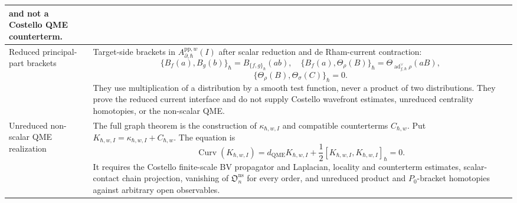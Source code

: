 \begin{longtable}{@{}>{\raggedright\arraybackslash}p{}
  >{\raggedright\arraybackslash}p{}@{}}
and not a Costello QME counterterm.\\
\hline
Reduced principal-part brackets &
Target-side brackets in
\(A_{\partial,\hbar}^{\mathrm{pp},w}(I)\) after scalar reduction and
de Rham-current contraction:
\[
  \{B_f(a),B_g(b)\}_\hbar=B_{\{f,g\}_\hbar}(ab),\quad
  \{B_f(a),\Theta_\rho(B)\}_\hbar
    =\Theta_{\operatorname{ad}^{\vee}_{f,\hbar}\rho}(aB),
\]
\[
  \{\Theta_\rho(B),\Theta_\sigma(C)\}_\hbar=0 .
\]
They use multiplication of a distribution by a smooth test function,
never a product of two distributions.  They prove the reduced current
interface and do not supply Costello wavefront estimates, unreduced
centrality homotopies, or the non-scalar QME.\\
\hline
Unreduced non-scalar QME realization &
The full graph theorem is the construction of
\(\kappa_{\hbar,w,I}\) and compatible counterterms
\(C_{\hbar,w}\).  Put
\(K_{\hbar,w,I}=\kappa_{\hbar,w,I}+C_{\hbar,w}\).  The equation is
\[
  \operatorname{Curv}(K_{\hbar,w,I})
  =
  d_{\mathrm{QME}}K_{\hbar,w,I}
  +\frac12[K_{\hbar,w,I},K_{\hbar,w,I}]_\hbar
  =0.
\]
It requires the Costello finite-scale BV propagator and Laplacian,
locality and counterterm estimates, scalar-contact chain projection,
vanishing of \(\mathfrak O^{\mathrm{ns}}_n\) for every order, and
unreduced product and \(P_0\)-bracket homotopies against arbitrary open
observables.\\
\hline
\end{longtable}

